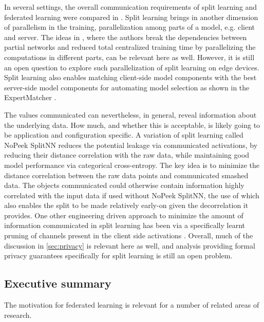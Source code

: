 \documentclass[11pt]{article}
\begin{document}
In several settings, the overall communication requirements of split learning and federated learning were compared in \citep{vepakomma2019splitComm}. Split learning brings in another dimension of parallelism in the training, parallelization among parts of a model, e.g. client and server. The ideas in \citep{jaderberg2017decoupled, huo2018training}, where the authors break the dependencies between partial networks and reduced total centralized training time by parallelizing the computations in different parts, can be relevant here as well. However, it is still an open question to explore such parallelization of split learning on edge devices. Split learning also enables matching client-side model components with the best server-side model components for automating model selection as shown in the ExpertMatcher \cite{sharma2019expertmatcher}.

The values communicated can nevertheless, in general, reveal information about the underlying data. How much, and whether this is acceptable, is likely going to be application and configuration specific. A variation of split learning called NoPeek SplitNN \citep{vepakomma2019reducing} reduces the potential leakage via communicated activations, by reducing their distance correlation \citep{vepakomma2018supervised,szekely2007measuring} with the raw data, while maintaining good model performance via categorical cross-entropy. The key idea is to minimize the distance correlation between the raw data points and communicated smashed data. The objects communicated could otherwise contain information highly correlated with the input data if used without NoPeek SplitNN, the use of which also enables the split to be made relatively early-on given the decorrelation it provides. One other engineering driven approach to minimize the amount of information communicated in split learning has been via a specifically learnt pruning of channels present in the client side activations \citep{channelPruning}. Overall, much of the discussion in \cref{sec:privacy} is relevant here as well, and analysis providing formal privacy guarantees specifically for split learning is still an open problem.

\subsection{Executive summary}
The motivation for federated learning is relevant for a number of related areas of research.
\end{document}
